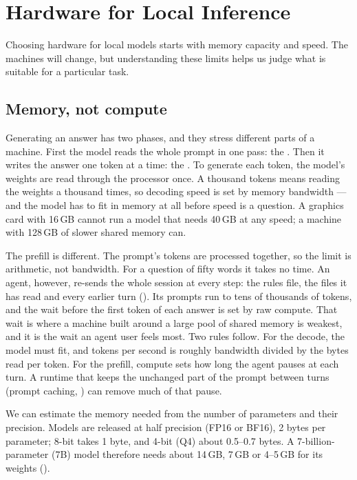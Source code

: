 \chapter{Hardware for Local Inference}
\label{ch:hardware}

Choosing hardware for local models starts with memory capacity and speed.
The machines will change, but understanding these limits helps us judge what
is suitable for a particular task.

\section{Memory, not compute}

Generating an answer has two phases, and they stress different parts of a
machine. First the model reads the whole prompt in one pass: the
. Then it writes the answer one token at a time: the
. To generate each token, the model's weights are read through the
processor once. A thousand tokens means reading the weights a thousand times,
so decoding speed is set by memory bandwidth --- and the model has to fit in
memory at all before speed is a question. A graphics card with 16\,GB cannot
run a model that needs 40\,GB at any speed; a machine with 128\,GB of slower
shared memory can.

The prefill is different. The prompt's tokens are processed together, so the
limit is arithmetic, not bandwidth. For a question of fifty words it takes no
time. An agent, however, re-sends the whole session at every step: the rules
file, the files it has read and every earlier turn (). Its
prompts run to tens of thousands of tokens, and the wait before the first token
of each answer is set by raw compute. That wait is where a machine built around
a large pool of shared memory is weakest, and it is the wait an agent user
feels most. Two rules follow. For the decode, the model must fit, and tokens
per second is roughly bandwidth divided by the bytes read per token. For the
prefill, compute sets how long the agent pauses at each turn. A runtime that
keeps the unchanged part of the prompt between turns (prompt caching,
) can remove much of that pause.

We can estimate the memory needed from the number of parameters and their
precision. Models are released at half precision (FP16 or BF16), 2 bytes per
parameter; 8-bit takes 1 byte, and 4-bit (Q4) about 0.5--0.7 bytes. A
7-billion-parameter (7B) model therefore needs about 14\,GB, 7\,GB or 4--5\,GB
for its weights ().

